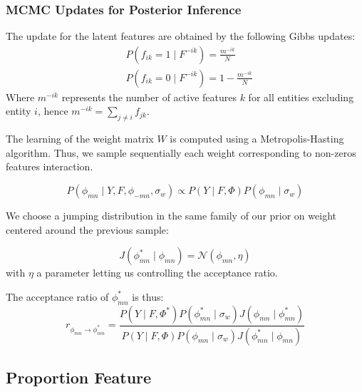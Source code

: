 \subsubsection{MCMC Updates for Posterior Inference}

The update for the latent features are obtained by the following Gibbs updates:
\begin{align}
& P(f_{ik} = 1 \mid F^{-ik}) = \frac{m^{-ik}}{N} \\
& P(f_{ik} = 0 \mid F^{-ik}) = 1 - \frac{m^{-ik}}{N}
\end{align}
Where $m^{-ik}$ represents the number of active features $k$ for all entities excluding entity $i$, hence $m^{-ik} = \sum_{j\neq i}f_{jk}$. 

The learning of the weight matrix $W$ is computed using a Metropolis-Hasting algorithm. Thus, we sample sequentially each weight corresponding to non-zeros features interaction.

\begin{equation}
P(\phi_{mn} \mid Y, F, \phi_{-mn}, \sigma_w) \propto P(Y \mid F, \Phi) P(\phi_{mn} \mid \sigma_w)
\end{equation}

We choose a jumping distribution in the same family of our prior on weight centered around the previous sample:

\begin{equation} \label{eq:j_w}
J(\phi_{mn}^* \mid \phi_{mn}) = \mathcal{N}(\phi_{mn}, \eta)
\end{equation}
with $\eta$ a parameter letting us controlling the acceptance ratio.

The acceptance ratio of $\phi_{mn}^*$ is thus:
\begin{equation} \label{eq:r_w}
r_{\phi_{mn}\rightarrow \phi_{mn}^*} = \frac{ P(Y \mid F, \Phi^*)P(\phi_{mn}^* \mid \sigma_w)J(\phi_{mn} \mid \phi_{mn}^*) }{ P(Y \mid F, \Phi)P(\phi_{mn} \mid \sigma_w)J(\phi_{mn}^* \mid \phi_{mn} )}
\end{equation}



\subsection{Proportion Feature}

